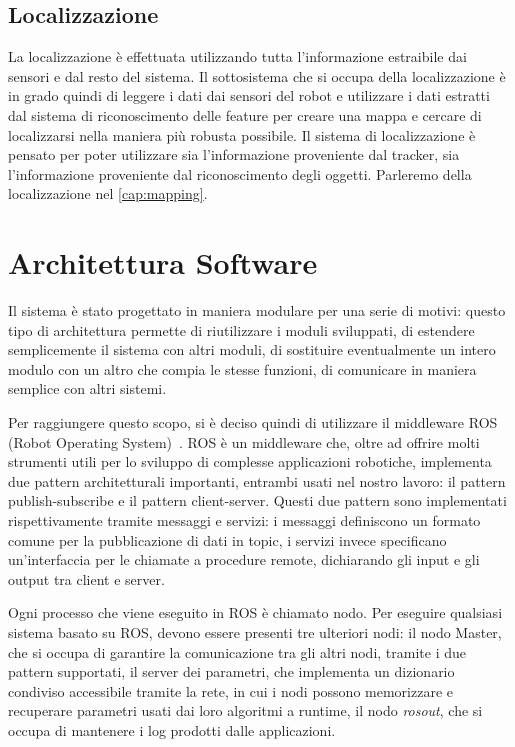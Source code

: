 \subsection{Localizzazione}
La localizzazione è effettuata utilizzando tutta l'informazione estraibile dai sensori e dal resto del sistema.
Il sottosistema che si occupa della localizzazione è in grado quindi di leggere i dati dai sensori del robot e utilizzare i dati estratti dal sistema di riconoscimento delle feature per creare una mappa e cercare di localizzarsi nella maniera più robusta possibile.
Il sistema di localizzazione è pensato per poter utilizzare sia l'informazione proveniente dal tracker, sia l'informazione proveniente dal riconoscimento degli oggetti.
Parleremo della localizzazione nel \autoref{cap:mapping}.

\section{Architettura Software}
Il sistema è stato progettato in maniera modulare per una serie di motivi: questo tipo di architettura permette di riutilizzare i moduli sviluppati, di estendere semplicemente il sistema con altri moduli, di sostituire eventualmente un intero modulo con un altro che compia le stesse funzioni, di comunicare in maniera semplice con altri sistemi. 

Per raggiungere questo scopo, si è deciso quindi di utilizzare il middleware ROS (Robot Operating System)~\cite{quigley2009ros}.
ROS è un middleware che, oltre ad offrire molti strumenti utili per lo sviluppo di complesse applicazioni robotiche, implementa due pattern architetturali importanti, entrambi usati nel nostro lavoro: il pattern publish-subscribe e il pattern client-server.
Questi due pattern sono implementati rispettivamente tramite messaggi e servizi: i messaggi definiscono un formato comune per la pubblicazione di dati in topic, i servizi invece specificano un'interfaccia per le chiamate a procedure remote, dichiarando gli input e gli output tra client e server.

Ogni processo che viene eseguito in ROS è chiamato nodo. Per eseguire qualsiasi sistema basato su ROS, devono essere presenti tre ulteriori nodi: il nodo Master, che si occupa di garantire la comunicazione tra gli altri nodi, tramite i due pattern supportati, il server dei parametri, che implementa un dizionario condiviso accessibile tramite la rete, in cui i nodi possono memorizzare e recuperare parametri usati dai loro algoritmi a runtime, il nodo \textit{rosout}, che si occupa di mantenere i log prodotti dalle applicazioni.

